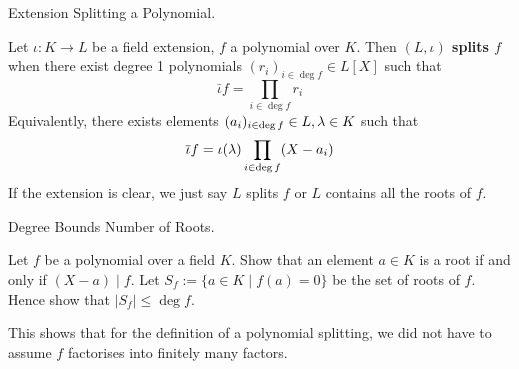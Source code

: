 \documentclass[../book.tex]{subfiles}
\begin{document}
\begin{dfn} Extension Splitting a Polynomial. 
    
    Let $\iota : K \to L$ be a field extension, $f$ a polynomial over $K$. 
    Then \textbf{$(L,\iota)$ splits $f$} when there exist degree 1 polynomials
    $(r_i)_{i\in\deg f} \in L[X]$ such that \[
        \bar\iota f = \prod_{i\in\deg f} r_i
    \]
    Equivalently, there exists elements $(a_i)_{i\in\deg f} \in L, \lambda \in K$ 
    such that \[
        \overline{\iota} f = \iota(\lambda)\prod_{i\in\deg f} (X - a_i)
    \]
    If the extension is clear, we just say $L$ splits $f$ or
    $L$ contains all the roots of $f$. 
\end{dfn}

\begin{ex} Degree Bounds Number of Roots. 

    Let $f$ be a polynomial over a field $K$.
    Show that an element $a \in K$ is a root if and only if $(X-a) \mid f$.
    Let $S_f := \{a \in K \mid f(a) = 0\}$ be the set of roots of $f$. 
    Hence show that $|S_f| \leq \deg f$.
    
    This shows that for the definition of a polynomial splitting, 
    we did not have to assume $f$ factorises into finitely
    many factors. 
\end{ex}
\end{document}
